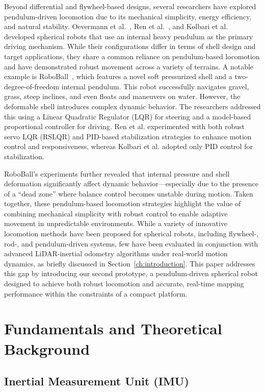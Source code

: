 \documentclass[english, bachelor, utf8]{base/thesis_telematics}
\begin{document}
Beyond differential and flywheel-based designs, several researchers have explored pendulum-driven locomotion due to its mechanical simplicity, energy efficiency, and natural stability. 
Oevermann et al.~\cite{roboball}, Ren et al.~\cite{novelsphere}, and Kolbari et al.~\cite{pendulum_sphere} developed spherical robots that use an internal heavy pendulum as the primary driving mechanism. 
While their configurations differ in terms of shell design and target applications, they share a common reliance on pendulum-based locomotion and have demonstrated robust movement across a variety of terrains.
A notable example is RoboBall~\cite{roboball}, which features a novel soft pressurized shell and a two-degree-of-freedom internal pendulum. 
This robot successfully navigates gravel, grass, steep inclines, and even floats and maneuvers on water. 
However, the deformable shell introduces complex dynamic behavior. 
The researchers addressed this using a Linear Quadratic Regulator (LQR) for steering and a model-based proportional controller for driving. 
Ren et al. \cite{novelsphere} experimented with both robust servo LQR (RSLQR) and PID-based stabilization strategies to enhance motion control and responsiveness, whereas Kolbari et al. \cite{pendulum_sphere} adopted only PID control for stabilization. 

RoboBall’s experiments further revealed that internal pressure and shell deformation significantly affect dynamic behavior—especially due to the presence of a ``dead zone'' where balance control becomes unstable during motion.
Taken together, these pendulum-based locomotion strategies highlight the value of combining mechanical simplicity with robust control to enable adaptive movement in unpredictable environments.
While a variety of innovative locomotion methods have been proposed for spherical robots, including flywheel-, rod-, and pendulum-driven systems, few have been evaluated in conjunction with advanced LiDAR-inertial odometry algorithms under real-world motion dynamics, as briefly discussed in Section~\ref{ch:introduction}.
This paper addresses this gap by introducing our second prototype, a pendulum-driven spherical robot designed to achieve both robust locomotion and accurate, real-time mapping performance within the constraints of a compact platform.

\chapter{Fundamentals and Theoretical Background}
\section{Inertial Measurement Unit (IMU)}
\end{document}
